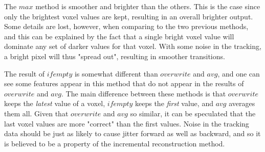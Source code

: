 	The $max$ method is smoother and brighter than the others. This is the case since only the brightest voxel values are kept, resulting in an overall brighter output. Some details are lost, however, when comparing to the two previous methods, and this can be explained by the fact that a single bright voxel value will dominate any set of darker values for that voxel. With some noise in the tracking, a bright pixel will thus "spread out", resulting in smoother transitions.
	
	The result of $ifempty$ is somewhat different than $overwrite$ and $avg$, and one can see some features appear in this method that do not appear in the results of $overwrite$ and $avg$. The main difference between these methods is that $overwrite$ keeps the \emph{latest} value of a voxel, $ifempty$ keeps the \emph{first} value, and $avg$ averages them all. Given that $overwrite$ and $avg$ so similar, it can be speculated that the last voxel values are more "correct" than the first values. Noise in the tracking data should be just as likely to cause jitter forward as well as backward, and so it is believed to be a property of the incremental reconstruction method.